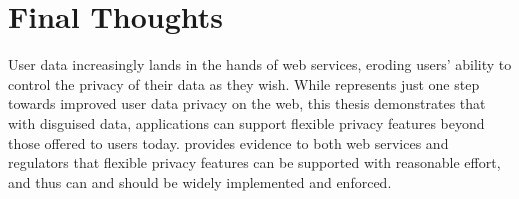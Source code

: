 %
%
%
\section{Final Thoughts}
User data increasingly lands in the hands of web services, eroding users'
ability to control the privacy of their data as they wish.
%
While \sys represents just one step towards improved user data privacy on
the web, this thesis demonstrates that with disguised data,
applications can support flexible privacy features beyond those offered to users
today.
%
\sys provides evidence to both web services and regulators that flexible privacy
features can be supported with reasonable effort, and thus can and should be
widely implemented and enforced.
%

